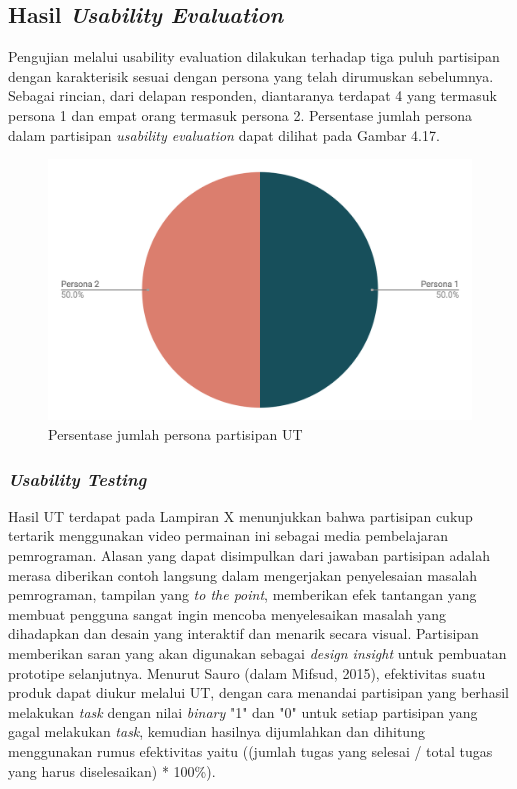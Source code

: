 	\subsection{Hasil \textit{Usability Evaluation}}
	Pengujian melalui usability evaluation dilakukan terhadap tiga puluh partisipan dengan karakterisik sesuai dengan persona yang telah dirumuskan sebelumnya. Sebagai rincian, dari delapan responden, diantaranya terdapat 4 yang termasuk persona 1 dan empat orang termasuk persona 2. Persentase jumlah persona dalam partisipan \textit{usability evaluation} dapat dilihat pada Gambar 4.17.
	\begin{figure}
		\includegraphics[width=\linewidth]{pics/persentase-jumlah-persona}
		\caption{Persentase jumlah persona partisipan UT}
		\centering
	\end{figure}
	\subsubsection{\textit{Usability Testing}}
	Hasil UT terdapat pada Lampiran X menunjukkan bahwa partisipan cukup tertarik menggunakan video permainan ini sebagai media pembelajaran pemrograman. Alasan yang dapat disimpulkan dari jawaban partisipan adalah merasa diberikan contoh langsung dalam mengerjakan penyelesaian masalah pemrograman, tampilan yang \textit{to the point}, memberikan efek tantangan yang membuat pengguna sangat ingin mencoba menyelesaikan masalah yang dihadapkan dan desain yang interaktif dan menarik secara visual. Partisipan memberikan saran yang akan digunakan sebagai \textit{design insight} untuk pembuatan prototipe selanjutnya.
	\linebreak\linebreak
	Menurut Sauro (dalam Mifsud, 2015), efektivitas suatu produk dapat diukur melalui UT, dengan cara menandai partisipan yang berhasil melakukan \textit{task} dengan nilai \textit{binary} "1" dan "0" untuk setiap partisipan yang gagal melakukan \textit{task}, kemudian hasilnya dijumlahkan dan dihitung menggunakan rumus efektivitas yaitu ((jumlah tugas yang selesai / total tugas yang harus diselesaikan) * 100\%).
